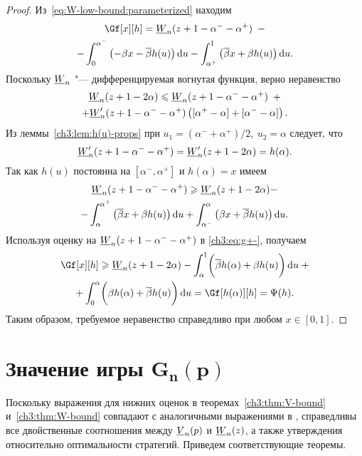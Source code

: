 {\begin{proof}
  Из~\eqref{eq:W-low-bound:parameterized} находим
  \begin{multline}\label{ch3:eq:g+-}
    \Gf[x][h] = \LW{n}(z + 1 - \alpha^- - \alpha^+) \enskip - \\
    - \int_0^{\alpha^-} \left(-\Co x - \DCo h(u)\right) \di u -
    \int_{\alpha^+}^1 \left(\DCo x + \Co h(u)\right) \di u.
  \end{multline}
  Поскольку $\LW{n}$ "--- дифференцируемая вогнутая функция, верно неравенство
  \begin{multline*}
    \LW{n}(z + 1 - 2\alpha) \leqslant \LW{n}(z + 1 - \alpha^- - \alpha^+) \enskip +\\
    + \LW[\prime]{n}(z + 1 - \alpha^- - \alpha^+) \left( [ \alpha^+ - \alpha ] + [
      \alpha^- - \alpha ] \right).
  \end{multline*}
  Из леммы~\ref{ch3:lem:h(u)-props} при $u_1 = (\alpha^- + \alpha^+)/2,\: u_2 = \alpha$ следует, что
  \[
    \LW[\prime]{n}(z + 1 - \alpha^- - \alpha^+) = \LW[\prime]{n}(z + 1 - 2\alpha) =
    h(\alpha).
  \]
  Так как $h(u)$ постоянна на $[\alpha^-, \alpha^+]$ и $h(\alpha) = x$ имеем
  \begin{multline*}
    \LW{n}(z + 1 - \alpha^- - \alpha^+) \geqslant \LW{n}(z + 1 - 2\alpha) - \\
    - \int_\alpha^{\alpha^+} \left( \DCo x + \Co h(u) \right) \di u +
    \int_{\alpha^-}^\alpha \left( \Co x + \DCo h(u) \right) \di u.
  \end{multline*}
  Используя оценку на $\LW{n}(z + 1 - \alpha^- - \alpha^+)$ в \eqref{ch3:eq:g+-}, получаем
  \begin{multline*}
    \Gf[x][h] \geqslant \LW{n}(z + 1 - 2\alpha)
    - \int_\alpha^1 \biggl( \DCo h(\alpha) + \Co h(u) \biggr) \di u \; + \\
    + \int_0^\alpha \biggl( \Co h(\alpha) + \DCo h(u) \biggr) \di u =
    \Gf[h(\alpha)][h] = \Psi(h).
  \end{multline*}
  Таким образом, требуемое неравенство справедливо при любом $x \in [0, 1]$.
\end{proof}

\section{Значение игры $\mathbf{G_n\left(p\right)}$}
\label{ch3:sec:game-value}

Поскольку выражения для нижних оценок в теоремах~\ref{ch3:thm:V-bound} и~\ref{ch3:thm:W-bound} совпадают с аналогичными выражениями в \cite{demeyer02}, справедливы все двойственные соотношения между $\LV{n}(p)$ и $\LW{n}(z)$, а также утверждения относительно оптимальности стратегий.
Приведем соответствующие теоремы.

}
